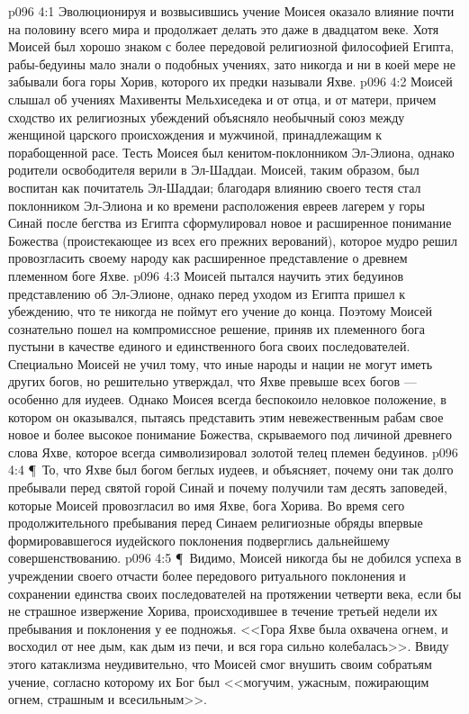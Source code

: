 \vs p096 4:1 Эволюционируя и возвысившись учение Моисея оказало влияние почти на половину всего мира и продолжает делать это даже в двадцатом веке. Хотя Моисей был хорошо знаком с более передовой религиозной философией Египта, рабы\hyp{}бедуины мало знали о подобных учениях, зато никогда и ни в коей мере не забывали бога горы Хорив, которого их предки называли Яхве.
\vs p096 4:2 Моисей слышал об учениях Махивенты Мельхиседека и от отца, и от матери, причем сходство их религиозных убеждений объясняло необычный союз между женщиной царского происхождения и мужчиной, принадлежащим к порабощенной расе. Тесть Моисея был кенитом\hyp{}поклонником Эл\hyp{}Элиона, однако родители освободителя верили в Эл\hyp{}Шаддаи. Моисей, таким образом, был воспитан как почитатель Эл\hyp{}Шаддаи; благодаря влиянию своего тестя стал поклонником Эл\hyp{}Элиона и ко времени расположения евреев лагерем у горы Синай после бегства из Египта сформулировал новое и расширенное понимание Божества (проистекающее из всех его прежних верований), которое мудро решил провозгласить своему народу как расширенное представление о древнем племенном боге Яхве.
\vs p096 4:3 Моисей пытался научить этих бедуинов представлению об Эл\hyp{}Элионе, однако перед уходом из Египта пришел к убеждению, что те никогда не поймут его учение до конца. Поэтому Моисей сознательно пошел на компромиссное решение, приняв их племенного бога пустыни в качестве единого и единственного бога своих последователей. Специально Моисей не учил тому, что иные народы и нации не могут иметь других богов, но решительно утверждал, что Яхве превыше всех богов --- особенно для иудеев. Однако Моисея всегда беспокоило неловкое положение, в котором он оказывался, пытаясь представить этим невежественным рабам свое новое и более высокое понимание Божества, скрываемого под личиной древнего слова Яхве, которое всегда символизировал золотой телец племен бедуинов.
\vs p096 4:4 \P\ То, что Яхве был богом беглых иудеев, и объясняет, почему они так долго пребывали перед святой горой Синай и почему получили там десять заповедей, которые Моисей провозгласил во имя Яхве, бога Хорива. Во время сего продолжительного пребывания перед Синаем религиозные обряды впервые формировавшегося иудейского поклонения подверглись дальнейшему совершенствованию.
\vs p096 4:5 \P\ Видимо, Моисей никогда бы не добился успеха в учреждении своего отчасти более передового ритуального поклонения и сохранении единства своих последователей на протяжении четверти века, если бы не страшное извержение Хорива, происходившее в течение третьей недели их пребывания и поклонения у ее подножья. <<Гора Яхве была охвачена огнем, и восходил от нее дым, как дым из печи, и вся гора сильно колебалась>>. Ввиду этого катаклизма неудивительно, что Моисей смог внушить своим собратьям учение, согласно которому их Бог был <<могучим, ужасным, пожирающим огнем, страшным и всесильным>>.

